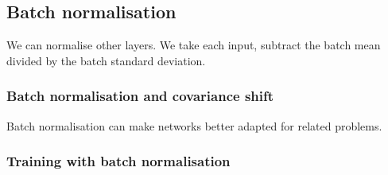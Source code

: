 
\subsection{Batch normalisation}

We can normalise other layers. We take each input, subtract the batch mean divided by the batch standard deviation.

\subsubsection{Batch normalisation and covariance shift}

Batch normalisation can make networks better adapted for related problems.

\subsubsection{Training with batch normalisation}

